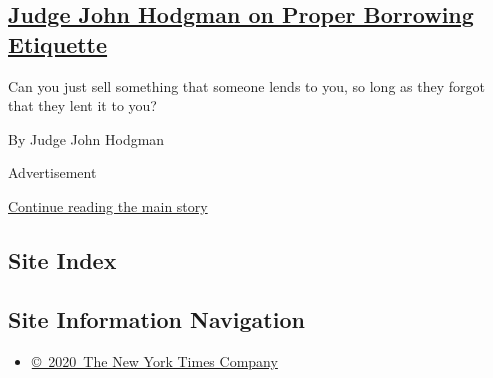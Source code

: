 \begin{enumerate}
  \hypertarget{judge-john-hodgman-on-proper-borrowing-etiquette}{%
  \subsection{\texorpdfstring{\href{/2019/07/09/magazine/judge-john-hodgman-on-proper-borrowing-etiquette.html}{Judge
  John Hodgman on Proper Borrowing
  Etiquette}}{Judge John Hodgman on Proper Borrowing Etiquette}}\label{judge-john-hodgman-on-proper-borrowing-etiquette}}

  Can you just sell something that someone lends to you, so long as they
  forgot that they lent it to you?

  By Judge John Hodgman
\end{enumerate}

Advertisement

\protect\hyperlink{after-mid1}{Continue reading the main story}

\hypertarget{site-index}{%
\subsection{Site Index}\label{site-index}}

\hypertarget{site-information-navigation}{%
\subsection{Site Information
Navigation}\label{site-information-navigation}}

\begin{itemize}
\tightlist
\item
  \href{https://help.nytimes3xbfgragh.onion/hc/en-us/articles/115014792127-Copyright-notice}{©~2020~The
  New York Times Company}
\end{itemize}

